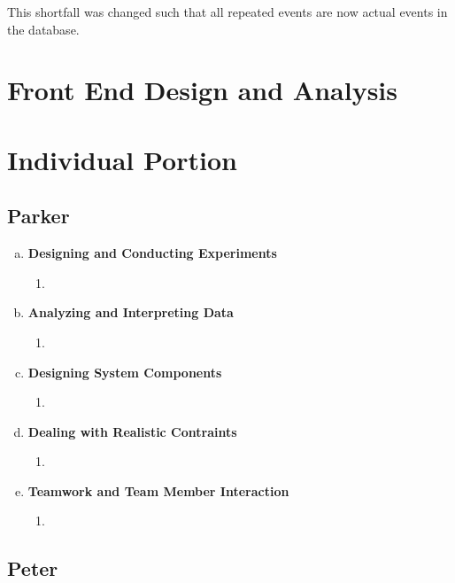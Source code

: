 \documentclass[11pt]{article}   %
\begin{document}
\noindent This shortfall was changed such that all repeated events are now actual events in the database.


\section{Front End Design and Analysis}



\section{Individual Portion}
\subsection*{Parker}

\begin{enumerate} [a)]
\item  {\bf Designing and Conducting Experiments}
\begin{enumerate} [$\cdot$]
\item 
\end{enumerate}
\item  {\bf Analyzing and Interpreting Data}
\begin{enumerate} [$\cdot$]
\item  
\end{enumerate}
\item {\bf Designing System Components}
\begin{enumerate} [$\cdot$]
\item 
\end{enumerate}
\item {\bf Dealing with Realistic Contraints}
\begin{enumerate} [$\cdot$]
\item 
\end{enumerate}
\item  {\bf Teamwork and Team Member Interaction}
\begin{enumerate} [$\cdot$]
\item 
\end{enumerate}
\end{enumerate}

\subsection*{Peter}
\end{document}
